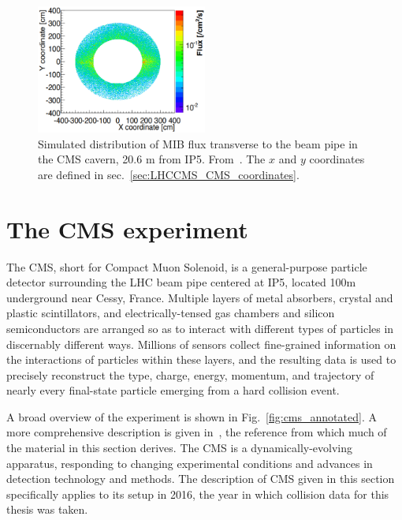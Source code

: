 \documentclass[oneside, letterpaper, 12pt, oldfontcommands]{memoir}
\begin{document}
\begin{figure}[hbtp]
  \begin{center}
    \includegraphics[width=0.50\textwidth]{Figures/beamhalo_sim.png}
    \caption{
    Simulated distribution of MIB flux transverse to the beam pipe in the CMS cavern,
    20.6 m from IP5. From~\cite{ref:1748-0221/10/11/P11011}. The $x$ and $y$ coordinates
    are defined in sec.~\ref{sec:LHCCMS_CMS_coordinates}.
    }
    \label{fig:beamhalo_sim}
  \end{center}
\end{figure}

\section{The CMS experiment} \label{sec:LHCCMS_CMS}
The CMS, short for Compact Muon Solenoid, is a general-purpose particle detector surrounding the LHC beam pipe
centered at IP5, located 100\unit{m} underground near Cessy, France. Multiple layers of metal absorbers, crystal and plastic scintillators,
and electrically-tensed gas chambers and silicon semiconductors are arranged so as to interact with different types of particles in discernably different ways.
Millions of sensors collect fine-grained information on the interactions of particles
within these layers, and the resulting data is used to precisely reconstruct the type, charge, energy, momentum, and trajectory
of nearly every final-state particle emerging from a hard collision event.

A broad overview of the experiment is shown in Fig.~\ref{fig:cms_annotated}.
A more comprehensive description is given in~\cite{ref:1748-0221/3/08/S08004}, the reference from which much of the material in this section derives.
The CMS is a dynamically-evolving apparatus, responding to changing experimental conditions and advances in detection technology and methods.
The description of CMS given in this section specifically applies to its setup in 2016, the year in which collision data for this thesis was taken.
\end{document}
